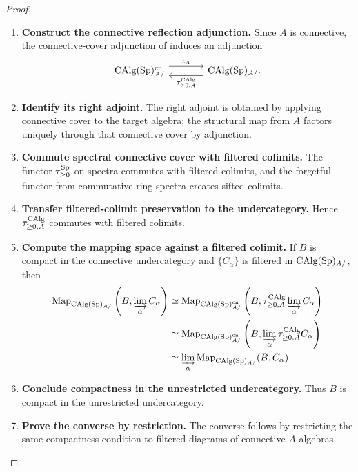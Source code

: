 \begin{proof}
\leavevmode
\begin{enumerate}[label=\textup{(\arabic*)}]
    \item \textbf{Construct the connective reflection adjunction.}
    Since \(A\) is connective, the connective-cover adjunction of
     induces an adjunction
    \[
    \begin{tikzcd}[column sep=large]
        \CAlg(\Sp)^{\mathrm{cn}}_{A/}
            \arrow[r, shift left=1.1ex, "\iota_A"]
        &
        \CAlg(\Sp)_{A/}
            \arrow[l, swap, shift left=1.1ex, "\tau^{\CAlg}_{\geq0,A}"'].
    \end{tikzcd}
    \]

    \item \textbf{Identify its right adjoint.}
    The right adjoint is obtained by applying connective cover to the target
    algebra; the structural map from \(A\) factors uniquely through that
    connective cover by adjunction.

    \item \textbf{Commute spectral connective cover with filtered colimits.}
    The functor \(\tau_{\geq0}^{\operatorname{Sp}}\) on spectra commutes with filtered colimits,
    and the forgetful functor from commutative ring spectra creates sifted
    colimits.

    \item \textbf{Transfer filtered-colimit preservation to the undercategory.}
    Hence \(\tau^{\operatorname{CAlg}}_{\geq0,A}\) commutes with filtered
    colimits.

    \item \textbf{Compute the mapping space against a filtered colimit.}
    If \(B\) is compact in the connective undercategory and
    \(\{C_\alpha\}\) is filtered in \(\operatorname{CAlg}(\operatorname{Sp})_{A/}\), then
    \[
    \begin{aligned}
        \operatorname{Map}_{\operatorname{CAlg}(\operatorname{Sp})_{A/}}
        \left(B,\varinjlim_\alpha C_\alpha\right)
        &\simeq
        \operatorname{Map}_{\operatorname{CAlg}(\operatorname{Sp})^{\mathrm{cn}}_{A/}}
        \left(
            B,
            \tau^{\operatorname{CAlg}}_{\geq0,A}\varinjlim_\alpha C_\alpha
        \right)
        \\
        &\simeq
        \operatorname{Map}_{\operatorname{CAlg}(\operatorname{Sp})^{\mathrm{cn}}_{A/}}
        \left(
            B,
            \varinjlim_\alpha\tau^{\operatorname{CAlg}}_{\geq0,A}C_\alpha
        \right)
        \\
        &\simeq
        \varinjlim_\alpha
        \operatorname{Map}_{\operatorname{CAlg}(\operatorname{Sp})_{A/}}(B,C_\alpha).
    \end{aligned}
    \]

    \item \textbf{Conclude compactness in the unrestricted undercategory.}
    Thus \(B\) is compact in the unrestricted undercategory.

    \item \textbf{Prove the converse by restriction.}
    The converse
    follows by restricting the same compactness condition to filtered
    diagrams of connective \(A\)-algebras.
\end{enumerate}
\end{proof}

